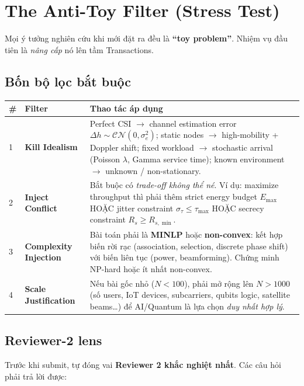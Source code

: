 \documentclass[11pt,a4paper]{article}
\begin{document}
\section{The Anti-Toy Filter (Stress Test)}

Mọi ý tưởng nghiên cứu khi mới đặt ra đều là \textbf{``toy problem''}. Nhiệm vụ đầu tiên là \textit{nâng cấp} nó lên tầm Transactions.

\subsection{Bốn bộ lọc bắt buộc}

\begin{longtable}{@{}p{0.6cm} p{3.5cm} p{10.4cm}@{}}
\toprule
\textbf{\#} & \textbf{Filter} & \textbf{Thao tác áp dụng} \\
\midrule
\endhead
1 & \textbf{Kill Idealism} &
Perfect CSI $\rightarrow$ channel estimation error $\Delta h \sim \mathcal{CN}(0, \sigma^2_e)$;
static nodes $\rightarrow$ high-mobility + Doppler shift;
fixed workload $\rightarrow$ stochastic arrival (Poisson $\lambda$, Gamma service time);
known environment $\rightarrow$ unknown / non-stationary. \\
2 & \textbf{Inject Conflict} &
Bắt buộc có \textit{trade-off không thể né}. Ví dụ: maximize throughput thì phải thêm strict energy budget $E_{\max}$ HOẶC jitter constraint $\sigma_\tau \leq \tau_{\max}$ HOẶC secrecy constraint $R_s \geq R_{s,\min}$. \\
3 & \textbf{Complexity Injection} &
Bài toán phải là \textbf{MINLP} hoặc \textbf{non-convex}: kết hợp biến rời rạc (association, selection, discrete phase shift) với biến liên tục (power, beamforming). Chứng minh NP-hard hoặc ít nhất non-convex. \\
4 & \textbf{Scale Justification} &
Nếu bài gốc nhỏ ($N < 100$), phải mở rộng lên $N > 1000$ (số users, IoT devices, subcarriers, qubits logic, satellite beams\dots) để AI/Quantum là lựa chọn \textit{duy nhất hợp lý}. \\
\bottomrule
\end{longtable}

\subsection{Reviewer-2 lens}

Trước khi submit, tự đóng vai \textbf{Reviewer 2 khắc nghiệt nhất}. Các câu hỏi phải trả lời được:
\end{document}
